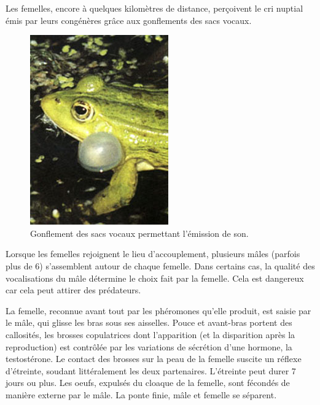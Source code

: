 Les femelles, encore à quelques kilomètres de distance, perçoivent le cri nuptial émis par leurs congénères grâce aux gonflements des sacs vocaux.


\begin{figure}
	\begin{center}
		\includegraphics[width=.9\textwidth]{laRepro/sacvocal.jpg}
		\caption{Gonflement des sacs vocaux permettant l'émission de son.}%
		\label{fig:grossejoue}
	\end{center}
\end{figure}

Lorsque les femelles rejoignent le lieu d’accouplement, plusieurs mâles (parfois plus de 6) s’assemblent autour de chaque femelle. 
Dans certains cas, la qualité des vocalisations du mâle détermine le choix fait par la femelle. Cela est dangereux car cela peut attirer des prédateurs.

La femelle, reconnue avant tout par les phéromones qu’elle produit, est saisie par le mâle, qui glisse les bras sous ses aisselles. 
Pouce et avant-bras portent des callosités, les brosses copulatrices dont l’apparition (et la disparition après la reproduction) est contrôlée par les variations de sécrétion d’une hormone, la testostérone.
Le contact des brosses sur la peau de la femelle suscite un réflexe d’étreinte, soudant littéralement les deux partenaires. 
L’étreinte peut durer 7 jours ou plus. Les oeufs, expulsés du cloaque de la femelle, sont fécondés de manière externe par le mâle. La ponte finie, mâle et femelle se séparent.

